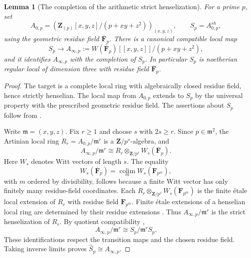 \documentclass[11pt,a4paper]{article}
\newtheorem{lemma}[theorem]{Lemma}
\theoremstyle{remark}
\newcommand{\Z}{\mathbf Z}
\newcommand{\F}{\mathbf F}
\newcommand{\m}{\mathfrak m}
\newcommand{\colim}{\operatorname*{colim}}
\begin{document}
\begin{lemma}[The completion of the arithmetic strict henselization]
\label{lem:stricthenselcompletion}
For a prime $p$, set
\[
 A_{0,p}=\left(\Z_{(p)}[x,y,z]/(p+xy+z^2)\right)_{(x,y,z)},
 \qquad S_p=A_{0,p}^{sh},
\]
using the geometric residue field $\overline{\F}_p$.
There is a canonical compatible local map
\[
 S_p\longrightarrow
 A_{\infty,p}:=W(\overline{\F}_p)[[x,y,z]]/(p+xy+z^2),
\]
and it identifies $A_{\infty,p}$ with the completion of $S_p$.
In particular $S_p$ is noetherian regular local of dimension three
with residue field $\overline{\F}_p$.
\end{lemma}
\begin{proof}
The target is a complete local ring with algebraically closed residue
field, hence strictly henselian.  The local map from $A_{0,p}$ extends
to $S_p$ by the universal property with the prescribed geometric
residue field.  The assertions about $S_p$ follow from
\cite[Section~15.46]{StacksHenselization}.

Write $\m=(x,y,z)$.  Fix $r\geq1$ and choose $s$ with $2s\geq r$.
Since $p\in\m^2$, the Artinian local ring
$R_r=A_{0,p}/\m^r$ is a $\Z/p^s$-algebra, and
\[
 A_{\infty,p}/\m^r
 \cong R_r\otimes_{\Z/p^s}W_s(\overline{\F}_p).
\]
Here $W_s$ denotes Witt vectors of length $s$.  The equality
\[
 W_s(\overline{\F}_p)=\colim_m W_s(\F_{p^m}),
\]
with $m$ ordered by divisibility, follows because a finite Witt vector
has only finitely many residue-field coordinates.  Each
$R_r\otimes_{\Z/p^s}W_s(\F_{p^m})$ is the finite \'etale local extension
of $R_r$ with residue field $\F_{p^m}$.
Finite \'etale extensions of a henselian local ring are determined by
their residue extensions \cite[Tag~04GK]{StacksHenselization}.
Thus $A_{\infty,p}/\m^r$ is the strict henselization of $R_r$.
By quotient compatibility
\cite[Section~10.156, Lemma~10.156.4]{StacksHenselization},
\[
 A_{\infty,p}/\m^r\cong S_p/\m^rS_p.
\]
These identifications respect the transition maps and the chosen
residue field.  Taking inverse limits proves
$\widehat S_p\cong A_{\infty,p}$.
\end{proof}
\end{document}
